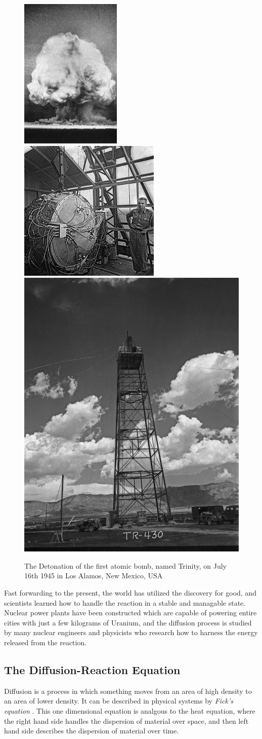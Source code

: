 \documentclass[letterpaper, 12pt]{article}
\begin{document}
         \begin{figure}
            \centering
            \includegraphics[width = 0.25\linewidth]{Images/Trinity_Test.jpg}
            \includegraphics[width = 0.3763\linewidth]{Images/Trinity_Bomb.jpg}
            \includegraphics[width = 0.294\linewidth]{Images/Trinity_Tower.jpg}
            \caption{The Detonation of the first atomic bomb, named Trinity, on July 16th 1945 in Los Alamos, New Mexico, USA}
            \label{img:Trinity_Test}
         \end{figure}

         Fast forwarding to the present, the world has utilized the discovery for good, and scientists learned how to handle the reaction in a stable and managable state. Nuclear power plants have been constructed which are capable of powering entire cities with just a few kilograms of Uranium, and the diffusion process is studied by many nuclear engineers and physicists who research how to harness the energy released from the reaction.

      \subsection{The Diffusion-Reaction Equation}
         Diffusion is a process in which something moves from an area of high density to an area of lower density. It can be described in physical systems by \textit{Fick's equation} \cite{Nuclear_Power_2021}. This one dimensional equation is analgous to the heat equation, where the right hand side handles the dispersion of material over space, and then left hand side describes the dispersion of material over time. 
\end{document}
